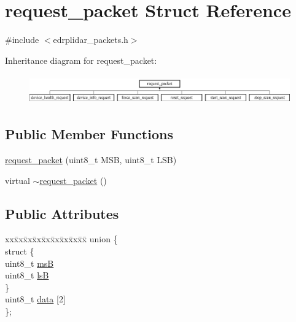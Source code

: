 \hypertarget{structrequest__packet}{\section{request\-\_\-packet Struct Reference}
\label{structrequest__packet}
}


{\ttfamily \#include $<$edrplidar\-\_\-packets.\-h$>$}

Inheritance diagram for request\-\_\-packet\-:\begin{figure}[H]
\begin{center}
\leavevmode
\includegraphics[height=1.269841cm]{structrequest__packet}
\end{center}
\end{figure}
\subsection*{Public Member Functions}
\begin{DoxyCompactItemize}
\item 
\hyperlink{structrequest__packet_a0c8aac3f578beedf0546ca9ad7bdcf6b}{request\-\_\-packet} (uint8\-\_\-t M\-S\-B, uint8\-\_\-t L\-S\-B)
\item 
virtual \hyperlink{structrequest__packet_a8807bb7660042e8b5d024e0b494d5165}{$\sim$request\-\_\-packet} ()
\end{DoxyCompactItemize}
\subsection*{Public Attributes}
\begin{DoxyCompactItemize}
\item 
\begin{tabbing}
xx\=xx\=xx\=xx\=xx\=xx\=xx\=xx\=xx\=\kill
union \{\\
\>struct \{\\
\>\>uint8\_t \hyperlink{structrequest__packet_a5b313981d2e1b5d5966b0e76df27f2a1}{msB}\\
\>\>uint8\_t \hyperlink{structrequest__packet_a8acbd68bdbd185926f3a4addb920488b}{lsB}\\
\>\} \\
\>uint8\_t \hyperlink{structrequest__packet_aa491a1d59ef4c4b2d40575569e9c5e2d}{data} \mbox{[}2\mbox{]}\\
\}; \\

\end{tabbing}\end{DoxyCompactItemize}


